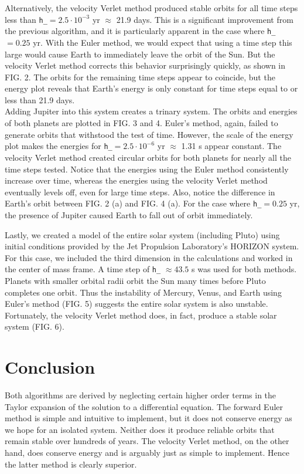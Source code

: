 \documentclass[prb,aps,twocolumn,showpacs,10pt]{revtex4-1}
\begin{document}
Alternatively, the velocity Verlet method produced stable orbits for all time steps less than \texttt{h\_}$=2.5\cdot10^{-3}$ yr $\approx$ 21.9 days. This is a significant improvement from the previous algorithm, and it is particularly apparent in the case where \texttt{h\_}$=0.25$ yr. With the Euler method, we would expect that using a time step this large would cause Earth to immediately leave the orbit of the Sun. But the velocity Verlet method corrects this behavior surprisingly quickly, as shown in FIG. 2. The orbits for the remaining time steps appear to coincide, but the energy plot reveals that Earth's energy is only constant for time steps equal to or less than 21.9 days.\\

Adding Jupiter into this system creates a trinary system. The orbits and energies of both planets are plotted in FIG. 3 and 4. Euler's method, again, failed to generate orbits that withstood the test of time. However, the scale of the energy plot makes the energies for \texttt{h\_}$=2.5\cdot10^{-6}$ yr $\approx$ 1.31 s appear constant. The velocity Verlet method created circular orbits for both planets for nearly all the time steps tested. Notice that the energies using the Euler method consistently increase over time, whereas the energies using the velocity Verlet method eventually levels off, even for large time steps. Also, notice the difference in Earth's orbit between FIG. 2 (a) and FIG. 4 (a). For the case where \texttt{h\_}$=0.25$ yr, the presence of Jupiter caused Earth to fall out of orbit immediately. 

Lastly, we created a model of the entire solar system (including Pluto) using initial conditions provided by the Jet Propulsion Laboratory's HORIZON system. For this case, we included the third dimension in the calculations and worked in the center of mass frame. A time step of \texttt{h\_} $\approx 43.5$ s was used for both methods.  Planets with smaller orbital radii orbit the Sun many times before Pluto completes one orbit. Thus the instability of Mercury, Venus, and Earth using Euler's method (FIG. 5) suggests the entire solar system is also unstable. Fortunately, the velocity Verlet method does, in fact, produce a stable solar system (FIG. 6).\\

\section{Conclusion}

Both algorithms are derived by neglecting certain higher order terms in the Taylor expansion of the solution to a differential equation. The forward Euler method is simple and intuitive to implement, but it does not conserve energy as we hope for an isolated system. Neither does it produce reliable orbits that remain stable over hundreds of years. The velocity Verlet method, on the other hand, does conserve energy and is arguably just as simple to implement. Hence the latter method is clearly superior.
\end{document}
